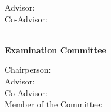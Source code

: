 \begin{titlepage}
\begin{center}
\begin{minipage}[t]{.35\textwidth}
  \begin{flushright}
    {\large Advisor:~~}\\
    {\large Co-Advisor:~~}
  \end{flushright}
\end{minipage}%
\begin{minipage}[t]{.65\textwidth}
  \begin{flushleft}
    {\Supervisors}
  \end{flushleft}
\end{minipage}\\
%
\if{}
  \vspace*{\finalAdvisorsSpacing}
\else
  \vspace*{\draftAdvisorsSpacing}
\fi
\if{}
%
{\Large \textbf{Examination Committee}}\\[.25cm]
\begin{minipage}[t]{.35\textwidth}
  \begin{flushright}
    \if{}
    {\large Chairperson:\:}\\
    \fi
    {\large Advisor:\:}\\
    \if{}
    {\large Co-Advisor:}\\
    \fi
    \if{}
    {\large Member of the Committee:\:}
    \fi
  \end{flushright}
\end{minipage}%
\begin{minipage}[t]{.65\textwidth}
  \begin{flushleft}
    \if{}
    {\Chairperson}\\
    \fi
    {\Advisor}\\
    \if{}
    {\CoAdvisor}\\
    \fi
    \if{}
    {\CommitteeMembers}
    \fi
  \end{flushleft}
\end{minipage}\\[1.0cm]
%
\fi

\if{}
 \vspace*{\dateSpacing}
\fi

{\Large \textbf{\Month\:\Year}}\\
\end{center}
\end{titlepage}

